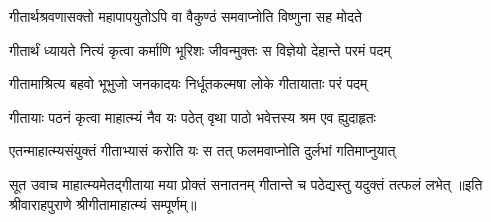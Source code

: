 \twolineshloka
{गीतार्थश्रवणासक्तो महापापयुतोऽपि वा}
{वैकुण्ठं समवाप्नोति विष्णुना सह मोदते}%

\twolineshloka
{गीतार्थं ध्यायते नित्यं कृत्वा कर्माणि भूरिशः}
{जीवन्मुक्तः स विज्ञेयो देहान्ते परमं पदम्}%

\twolineshloka
{गीतामाश्रित्य बहवो भूभुजो जनकादयः}
{निर्धूतकल्मषा लोके गीतायाताः परं पदम्}%

\twolineshloka
{गीतायाः पठनं कृत्वा माहात्म्यं नैव यः पठेत्}
{वृथा पाठो भवेत्तस्य श्रम एव ह्युदाहृतः}%

\twolineshloka
{एतन्माहात्म्यसंयुक्तं गीताभ्यासं करोति यः}
{स तत् फलमवाप्नोति दुर्लभां गतिमाप्नुयात्}%

{सूत उवाच}
\twolineshloka
{माहात्म्यमेतद्गीताया मया प्रोक्तं सनातनम्}
{गीतान्ते च पठेद्यस्तु यदुक्तं तत्फलं लभेत्}%
{॥इति श्रीवाराहपुराणे श्रीगीतामाहात्म्यं सम्पूर्णम्॥}
\clearpage